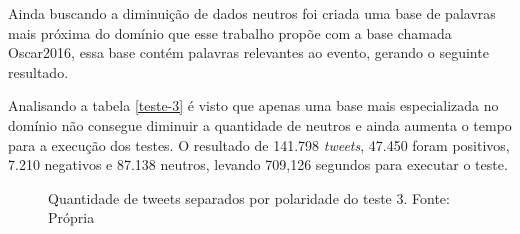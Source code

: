 Ainda buscando a diminuição de dados neutros foi criada uma base de palavras mais próxima do domínio que esse trabalho propõe com a base chamada Oscar2016, essa base contém palavras relevantes ao evento, gerando o seguinte resultado.

\begin{table}[]
	\caption{3º teste}
	\label{teste-3}
\end{table}

Analisando a tabela \ref{teste-3} é visto que apenas uma base mais especializada no domínio não consegue diminuir a quantidade de neutros e ainda aumenta o tempo para a execução dos testes. O resultado de 141.798 \textit{tweets}, 47.450 foram positivos, 7.210 negativos e 87.138 neutros, levando 709,126 segundos para executar o teste.

\begin{figure}[!h]
	\centering{}
	\caption{Quantidade de tweets separados por polaridade do teste 3. Fonte: Própria}
	\label{teste-graf-3}
\end{figure}

